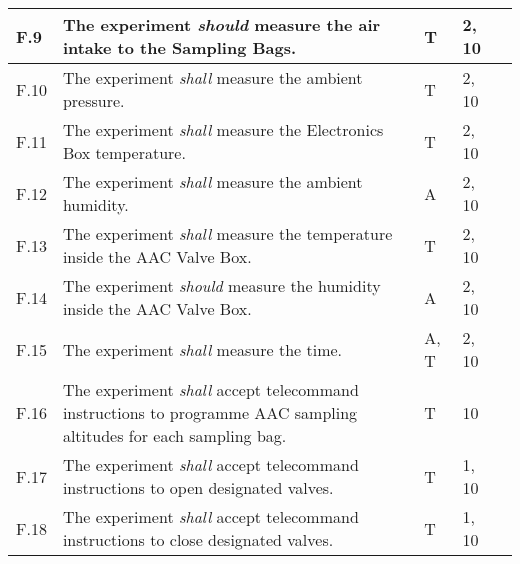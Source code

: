 \begin{longtable}[]{|m{}| m{} |m{} |m{}|m{}|}
F.9  & The experiment \textit{should} measure the air intake to the Sampling Bags.                                                                                                      &       T       & 2, 10            &        \\ \hline
F.10 & The experiment \textit{shall} measure the ambient pressure.                                                                                                                      &       T       & 2, 10            &        \\ \hline
F.11 & The experiment \textit{shall} measure the Electronics Box temperature.                                                                                                                   &       T       & 2, 10            &        \\ \hline
F.12 & The experiment \textit{shall} measure the ambient humidity.                                                                                                                      &      A        & 2, 10            &        \\ \hline
F.13 & The experiment \textit{shall} measure the temperature inside the AAC Valve Box.                                                                                                  &      T        & 2, 10            &        \\ \hline
F.14 & The experiment \textit{should} measure the humidity inside the AAC Valve Box.                                                                                                    &      A        & 2, 10            &        \\ \hline
F.15 & The experiment \textit{shall} measure the time.                                                                                                                                  &        A, T      & 2, 10            &        \\ \hline
F.16 & The experiment \textit{shall} accept telecommand instructions to programme AAC sampling altitudes for each sampling bag.                                                         &      T        & 10            &        \\ \hline
F.17 & The experiment \textit{shall} accept telecommand instructions to open designated valves.                                                                                         &      T        & 1, 10            &        \\ \hline
F.18 & The experiment \textit{shall} accept telecommand instructions to close designated valves.                                                                                        &      T        & 1, 10            &        \\ \hline

\end{longtable}

